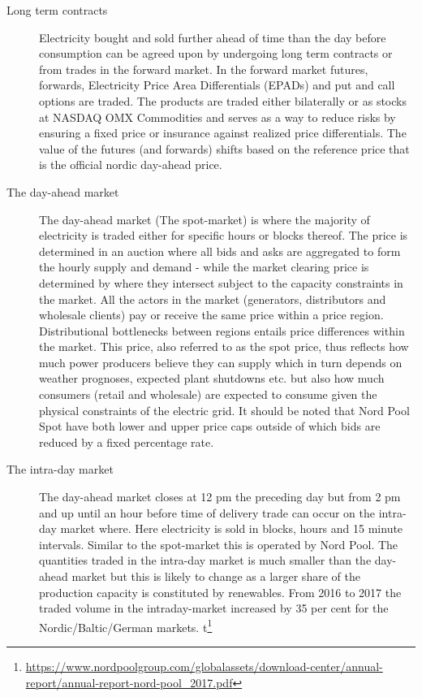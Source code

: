 \begin{description}

    \item [Long term contracts]
    Electricity bought and sold further ahead of time than the day before consumption can be agreed upon by undergoing long term contracts or from trades in the forward market. In the forward market futures, forwards, Electricity Price Area Differentials (EPADs) and put and call options are traded. The products are traded either bilaterally or as stocks at NASDAQ OMX Commodities and serves as a way to reduce risks by ensuring a fixed price or insurance against realized price differentials. The value of the futures (and forwards) shifts based on the reference price that is the official nordic day-ahead price.

    \item[The day-ahead market]
    The day-ahead market (The spot-market) is where the majority of electricity is traded either for specific hours or blocks thereof. The price is determined in an auction where all bids and asks are aggregated to form the hourly supply and demand - while the market clearing price is determined by where they intersect subject to the capacity constraints in the market. All the actors in the market (generators, distributors and wholesale clients) pay or receive the same price within a price region. Distributional bottlenecks between regions entails price differences within the market. This price, also referred to as the spot price, thus reflects how much power producers believe they can supply which in turn depends on weather prognoses, expected plant shutdowns etc. but also how much consumers (retail and wholesale) are expected to consume given the physical constraints of the electric grid. It should be noted that Nord Pool Spot have both lower and upper price caps outside of which bids are reduced by a fixed percentage rate.

    \item [The intra-day market]
     The day-ahead market closes at 12 pm the preceding day but from 2 pm and up until an hour before time of delivery trade can occur on the intra-day market where. Here electricity is sold in blocks, hours and 15 minute intervals. Similar to the spot-market this is operated by Nord Pool. The quantities traded in the intra-day market is much smaller than the day-ahead market but this is likely to change as a larger share of the production capacity is constituted by renewables. From 2016 to 2017 the traded volume in the intraday-market increased by 35 per cent for the Nordic/Baltic/German markets.  t\footnote{\url{https://www.nordpoolgroup.com/globalassets/download-center/annual-report/annual-report-nord-pool_2017.pdf}}  %


\end{description}
